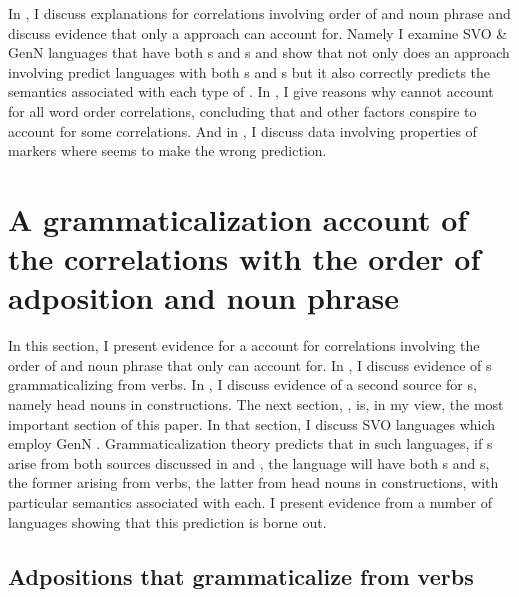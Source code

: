 \documentclass[output=paper]{langsci/langscibook}
\begin{document}
In , I discuss explanations for correlations involving order of  and noun phrase and discuss evidence that only a  approach can account for. Namely I examine SVO  \& GenN languages that have both s and s and show that not only does an approach involving  predict languages with both s and s but it also correctly predicts the semantics associated with each type of . 
In , I give reasons why  cannot account for all word order correlations, concluding that  and other factors conspire to account for some correlations. 
And in , I discuss data involving  properties of  markers where  seems to make the wrong prediction.

\section{A grammaticalization account of the correlations with the order of adposition and noun phrase} \label{sec:dryer:2}

In this section, I present evidence for a  account for correlations involving the order of  and noun phrase that only  can account for. In , I discuss evidence of s grammaticalizing from verbs. In , I discuss evidence of a second  source for s, namely head nouns in  constructions. The next section, , is, in my view, the most important section of this paper. In that section, I discuss SVO languages which employ GenN . Grammaticalization theory predicts that in such languages, if s arise from both  sources discussed in  and , the language will have both s and s, the former arising from verbs, the latter from head nouns in  constructions, with particular semantics associated with each. I present evidence from a number of languages showing that this prediction is borne out.

\subsection{Adpositions that grammaticalize from verbs}\label{sec:dryer:2.1}
\end{document}
